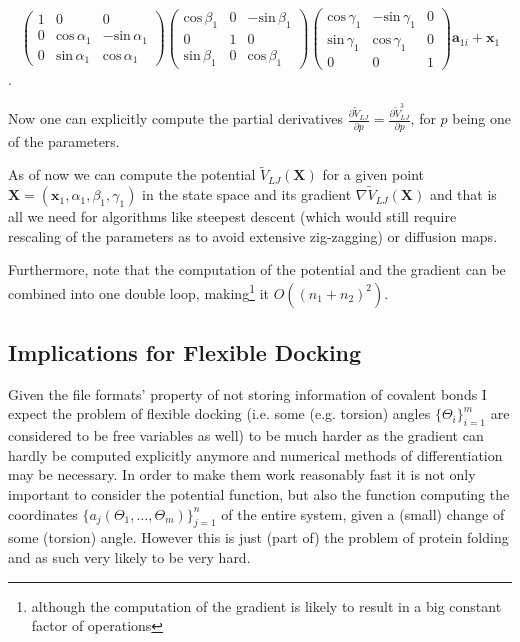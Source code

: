 $$\left(\begin{array}{ccc}
1 & 0 & 0 \\
0 & \text{cos}\,\alpha_1 & -\text{sin}\,\alpha_1 \\
0 & \text{sin}\,\alpha_1 &  \text{cos}\,\alpha_1 \end{array}\right)
\left(\begin{array}{ccc}
\text{cos}\,\beta_1 & 0 & -\text{sin}\,\beta_1 \\
0 & 1 & 0\\
\text{sin}\,\beta_1 & 0 &  \text{cos}\,\beta_1\end{array}\right)
\left(\begin{array}{ccc}
\text{cos}\,\gamma_1 & -\text{sin}\,\gamma_1 & 0 \\
\text{sin}\,\gamma_1 &  \text{cos}\,\gamma_1 & 0 \\
0 & 0 & 1 \end{array}\right)
\mathbf a_{1i} + \mathbf x_1$$.

Now one can explicitly compute the partial derivatives $\frac{\partial \tilde V_{LJ}}{\partial p} = \frac{\partial \tilde V_{LJ}^3}{\partial p}$, for $p$ being one of the parameters.

As of now we can compute the potential $\tilde V_{LJ}(\mathbf X)$ for a given point $\mathbf X = (\mathbf x_1,\alpha_1,\beta_1,\gamma_1)$ in the state space and its gradient $\nabla \tilde V_{LJ}(\mathbf X)$ and that is all we need for algorithms like steepest descent (which would still require rescaling of the parameters as to avoid extensive zig-zagging) or diffusion maps.

Furthermore, note that the computation of the potential and the gradient can be combined into one double loop, making\footnote{although the computation of the gradient is likely to result in a big constant factor of operations} it $O\left((n_1+n_2)^2\right)$.

\subsection{Implications for Flexible Docking}
Given the file formats' property of not storing information of covalent bonds I expect the problem of flexible docking (i.e. some (e.g. torsion) angles $\{\Theta_i\}_{i=1}^m$ are considered to be free variables as well) to be much harder as the gradient can hardly be computed explicitly anymore and numerical methods of differentiation may be necessary.
In order to make them work reasonably fast it is not only important to consider the potential function, but also the function computing the coordinates $\{a_j(\Theta_1,\dots,\Theta_m)\}_{j=1}^n$ of the entire system, given a (small) change of some (torsion) angle.
However this is just (part of) the problem of protein folding and as such very likely to be very hard.

